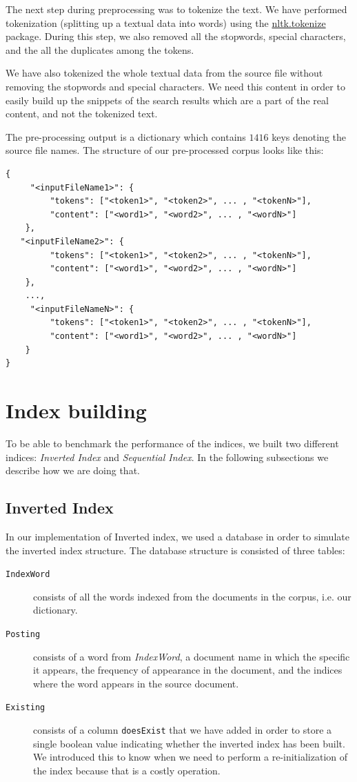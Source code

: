 \documentclass{article}
\begin{document}
The next step during preprocessing was to tokenize the text. We have performed tokenization (splitting up a textual data into words) using the \href{https://www.nltk.org/}{nltk.tokenize} package. During this step, we also removed all the stopwords, special characters, and the all the duplicates among the tokens.

We have also tokenized the whole textual data from the source file without removing the stopwords and special characters. We need this content in order to easily build up the snippets of the search results which are a part of the real content, and not the tokenized text.

The pre-processing output is a dictionary which contains $1416$ keys denoting the source file names. The structure of our pre-processed corpus looks like this:

\begin{verbatim}
{
     "<inputFileName1>": {
         "tokens": ["<token1>", "<token2>", ... , "<tokenN>"],
         "content": ["<word1>", "<word2>", ... , "<wordN>"]
    },
   "<inputFileName2>": {
         "tokens": ["<token1>", "<token2>", ... , "<tokenN>"],
         "content": ["<word1>", "<word2>", ... , "<wordN>"]
    },
    ...,
     "<inputFileNameN>": {
         "tokens": ["<token1>", "<token2>", ... , "<tokenN>"],
         "content": ["<word1>", "<word2>", ... , "<wordN>"]
    }
}
\end{verbatim}

\section{Index building}
To be able to benchmark the performance of the indices, we built two different indices: \textit{Inverted Index} and \textit{Sequential Index}. In the following subsections we describe how we are doing that.

\subsection{Inverted Index}
In our implementation of Inverted index, we used a database in order to simulate the inverted index structure. The database structure is consisted of three tables:
\begin{description}
    \item[\texttt{IndexWord}] consists of all the words indexed from the documents in the corpus, i.e. our dictionary.
    \item[\texttt{Posting}] consists of a word from \textit{IndexWord}, a document name in which the specific it appears, the frequency of appearance in the document, and the indices where the word appears in the source document.
    \item[\texttt{Existing}] consists of a column \texttt{doesExist} that we have added in order to store a single boolean value indicating whether the inverted index has been built. We introduced this to know when we need to perform a re-initialization of the index because that is a costly operation.
\end{description}
\end{document}
